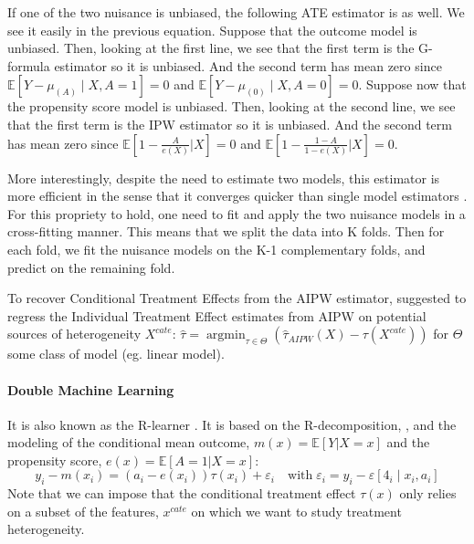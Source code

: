 \documentclass[french,12pt,twoside,a4paper]{book}
\DeclareMathOperator*{\argmin}{argmin} \def\mycitecolor{green!50!black}
\begin{document}
\begin{appendices}
  If one of the two nuisance is unbiased, the following ATE estimator is as
  well. We see it easily in the previous equation. Suppose that the outcome
  model is unbiased. Then, looking at the first line, we see that the first term
  is the G-formula estimator so it is unbiased. And the second term has mean
  zero since $\mathbb E [Y - \mu_{(A)} \mid X, A=1]=0$ and $\mathbb E [Y -
        \mu_{(0)} \mid X, A=0]=0$. Suppose now that the propensity score model is
  unbiased. Then, looking at the second line, we see that the first term is the
  IPW estimator so it is unbiased. And the second term has mean zero since
  $\mathbb E[1-\frac{A}{e(X)}|X]=0$ and $\mathbb E[1-\frac{1-A}{1-e(X)}|X]=0$.

  More interestingly, despite the need to estimate two models, this estimator is more
  efficient in the sense that it converges quicker than single model estimators
  \citep{wager2020stats}. For this propriety to hold, one need to fit and apply
  the two nuisance models in a cross-fitting manner. This means that we split
  the data into K folds. Then for each fold, we fit the nuisance models on the
  K-1 complementary folds, and predict on the remaining fold.

  To recover Conditional Treatment Effects from the AIPW estimator,
  \cite{foster2019orthogonal} suggested to regress the Individual Treatment
  Effect estimates from AIPW on potential sources of heterogeneity $X^{cate}$:
  $\hat \tau = \argmin_{\tau \in \Theta} (\hat \tau_{AIPW}(X) - \tau(X^{cate}))$
  for $\Theta$ some class of model (eg. linear model).

  \paragraph{Double Machine Learning} \citep{chernozhukov2018double} It is also known
  as the R-learner \citep{nie2021quasi}. It is based on the R-decomposition,
  \citep{robinson_rootnconsistent_1988}, and the modeling of the conditional mean outcome,
  $m(x)=\mathbb E[Y|X=x]$ and the propensity score, $e(x)=\mathbb E[A=1|X=x]$:
  \begin{equation}\label{eq:r_decomposition_dml}
    y_{i}-m\left(x_{i}\right)=\left(a_{i}-e\left(x_{i}\right)\right) \tau\left(x_{i}\right)+\varepsilon_{i} \quad \text{with} \; \varepsilon_{i}=y_{i}-\varepsilon\left[4_{i} \mid x_{i}, a_{i}\right]
  \end{equation}
  Note that we can impose that the conditional treatment effect $\tau(x)$ only
  relies on a subset of the features, $x^{cate}$ on which we want to study
  treatment heterogeneity.


\end{appendices}
\end{document}

